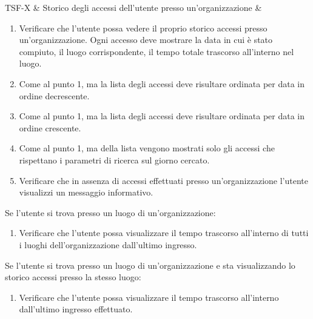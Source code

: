 TSF-X & Storico degli accessi dell'utente presso un'organizzazione & \begin{enumerate}
    \item Verificare che l'utente possa vedere il proprio storico accessi presso un'organizzazione. Ogni accesso deve mostrare la data in cui è stato compiuto, il luogo corrispondente, il tempo totale trascorso all'interno nel luogo.
    \item Come al punto 1, ma la lista degli accessi deve risultare ordinata per data in ordine decrescente.
    \item Come al punto 1, ma la lista degli accessi deve risultare ordinata per data in ordine crescente.
    \item Come al punto 1, ma della lista vengono mostrati solo gli accessi che rispettano i parametri di ricerca sul giorno cercato.
    \item Verificare che in assenza di accessi effettuati presso un'organizzazione l'utente visualizzi un messaggio informativo.
\end{enumerate}
Se l'utente si trova presso un luogo di un'organizzazione:
\begin{enumerate}
    \item Verificare che l'utente possa visualizzare il tempo trascorso all'interno di tutti i luoghi dell'organizzazione dall'ultimo ingresso. %
\end{enumerate}
Se l'utente si trova presso un luogo di un'organizzazione e sta visualizzando lo storico accessi presso la stesso luogo:
\begin{enumerate}
    \item Verificare che l'utente possa visualizzare il tempo trascorso all'interno dall'ultimo ingresso effettuato.
\end{enumerate} \\

